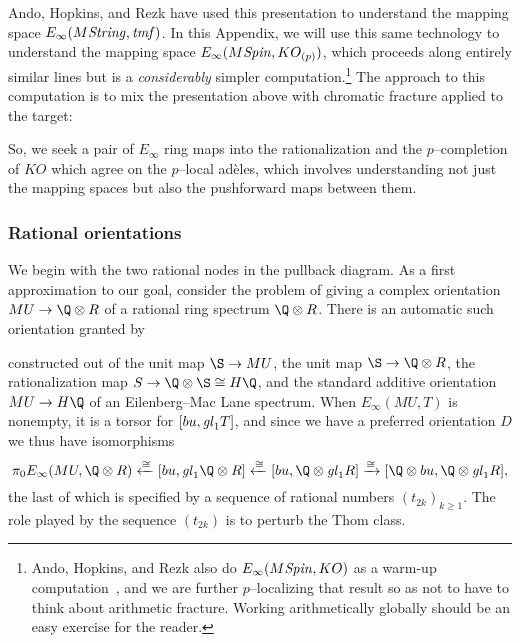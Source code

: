 Ando, Hopkins, and Rezk have used this presentation to understand the mapping space $E_\infty(M\mathit{String}, \mathit{tmf})$.  In this Appendix, we will use this same technology to understand the mapping space $E_\infty(M\mathit{Spin}, KO_{(p)})$, which proceeds along entirely similar lines but is a \emph{considerably} simpler computation.\footnote{Ando, Hopkins, and Rezk also do $E_\infty(M\mathit{Spin}, KO)$ as a warm-up computation~\cite[Section 7]{AHR}, and we are further $p$--localizing that result so as not to have to think about arithmetic fracture.  Working arithmetically globally should be an easy exercise for the reader.}  The approach to this computation is to mix the presentation above with chromatic fracture applied to the target:
\begin{center}
\end{center}
So, we seek a pair of $E_\infty$ ring maps into the rationalization and the $p$--completion of $KO$ which agree on the $p$--local ad\`eles, which involves understanding not just the mapping spaces but also the pushforward maps between them.


\subsubsection{Rational orientations}

We begin with the two rational nodes in the pullback diagram.  As a first approximation to our goal, consider the problem of giving a complex orientation $MU \to \Q \otimes R$ of a rational ring spectrum $\Q \otimes R$.  There is an automatic such orientation granted by
\begin{center}
\end{center}
constructed out of the unit map $\S \to MU$, the unit map $\S \to \Q \otimes R$, the rationalization map $S \to \Q \otimes \S \cong H\Q$, and the standard additive orientation $MU \to H\Q$ of an Eilenberg--Mac Lane spectrum.  When $E_\infty(MU, T)$ is nonempty, it is a torsor for $[bu, \mathit{gl}_1 T]$, and since we have a preferred orientation $D$ we thus have isomorphisms \[\pi_0 E_\infty(MU, \Q \otimes R) \xleftarrow{\cong} [bu, \gl_1 \Q \otimes R] \xleftarrow{\cong} [bu, \Q \otimes \gl_1 R] \xrightarrow{\cong} [\Q \otimes bu, \Q \otimes \gl_1 R],\] the last of which is specified by a sequence of rational numbers $(t_{2k})_{k \ge 1}$.  The role played by the sequence $(t_{2k})$ is to perturb the Thom class.

